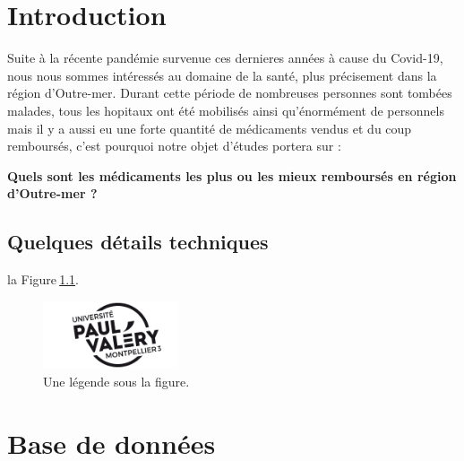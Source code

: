 \documentclass[mstat,12pt]{unswthesis}
\begin{document}
%
%






\hypertarget{introduction}{%
\chapter{Introduction}\label{introduction}}

Suite à la récente pandémie survenue ces dernieres années à cause du
Covid-19, nous nous sommes intéressés au domaine de la santé, plus
précisement dans la région d'Outre-mer. Durant cette période de
nombreuses personnes sont tombées malades, tous les hopitaux ont été
mobilisés ainsi qu'énormément de personnels mais il y a aussi eu une
forte quantité de médicaments vendus et du coup remboursés, c'est
pourquoi notre objet d'études portera sur :

\bigskip

\centering

\textbf{Quels sont les médicaments les plus ou les mieux remboursés en
région d'Outre-mer ?}

\bigskip

\justifying

\hypertarget{quelques-duxe9tails-techniques}{%
\section{Quelques détails
techniques}\label{quelques-duxe9tails-techniques}}

la Figure\(~\)\ref{myfigure}.

\begin{figure}
\hypertarget{myfigure}{%
\centering
\includegraphics[width=4cm,height=2cm]{logo-upvm_4.jpg}
\caption{Une légende sous la figure.}\label{myfigure}
}
\end{figure}

\hypertarget{base-de-donnuxe9es}{%
\chapter{Base de données}\label{base-de-donnuxe9es}}
\end{document}
